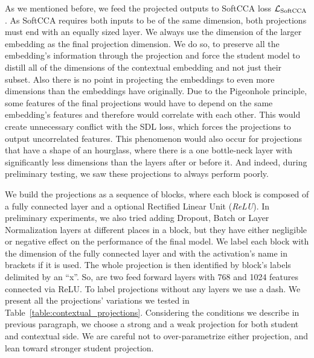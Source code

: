 As we mentioned before, we feed the projected outputs to SoftCCA loss
$\mathcal{L}_{\text{SoftCCA}}$. As SoftCCA requires both inputs to be of the same
dimension, both projections must end with an equally sized layer. We always use
the dimension of the larger embedding as the final projection dimension. We do
so, to preserve all the embedding's information through the projection and
force the student model to distill all of the dimensions of the contextual
embedding and not just their subset. Also there is no point in projecting the
embeddings to even more dimensions than the embeddings have originally. Due to
the Pigeonhole principle, some features of the final projections would have to
depend on the same embedding's features and therefore would correlate with each
other. This would create unnecessary conflict with the SDL loss, which forces
the projections to output uncorrelated features. This phenomenon would also
occur for projections that have a shape of an hourglass, where there is a one
bottle-neck layer with significantly less dimensions than the layers after or
before it. And indeed, during preliminary testing, we saw these projections to
always perform poorly.

We build the projections as a sequence of blocks, where each block is composed
of a fully connected layer and a optional Rectified Linear Unit (\emph{ReLU}).
In preliminary experiments, we also tried adding Dropout, Batch or Layer
Normalization layers at different places in a block, but they have either
negligible or negative effect on the performance of the final model. We label
each block with the dimension of the fully connected layer and with the
activation's name in brackets if it is used. The whole projection is then
identified by block's labels delimited by an ``x''. So, 
are two feed forward layers with 768 and 1024 features connected via ReLU. To
label projections without any layers we use a dash. We present all the
projections' variations we tested in Table~\ref{table:contextual_projections}.
Considering the conditions we describe in previous paragraph, we choose a
strong and a weak projection for both student and contextual side. We are
careful not to over-parametrize either projection, and lean toward stronger
student projection.

